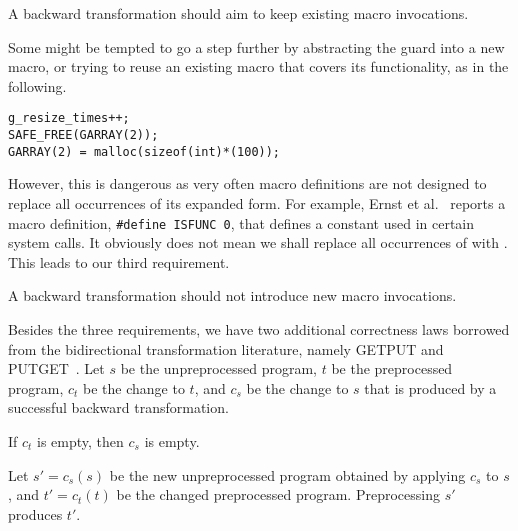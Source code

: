 \begin{decision}
A backward transformation should aim to keep existing macro invocations.
\end{decision}

Some might be tempted to go a step further by abstracting the guard into a new macro, or
trying to reuse an existing macro that covers its functionality, as in the following. 
\begin{lstlisting}
g_resize_times++;
SAFE_FREE(GARRAY(2));
GARRAY(2) = malloc(sizeof(int)*(100));
\end{lstlisting}
However, this is dangerous as very often macro definitions are
 not designed to replace all occurrences of its expanded
form. For example, Ernst et al.~\cite{ernst2002empirical} reports a
macro definition, \lstinline!#define ISFUNC 0!, that defines a constant used in certain system
calls. It obviously does not mean we shall replace all occurrences of 
with .
This
leads to our third requirement.

\begin{decision}
  A backward transformation should not introduce new macro invocations.
\end{decision}

Besides the three requirements, we have two additional correctness laws borrowed from the bidirectional transformation literature, namely GETPUT and
PUTGET~\cite{Foster:2007}. Let $s$ be the unpreprocessed
program, $t$ be the preprocessed program, $c_t$ be the change to $t$,
and $c_s$ be the change to $s$ that is produced by a successful
backward transformation.

\begin{decision}[GETPUT]
  If $c_t$ is empty, then $c_s$ is empty.
\end{decision}

\begin{decision}[PUTGET]
  Let $s'=c_s(s)$ be the new unpreprocessed program obtained by
  applying $c_s$ to $s$, and $t'=c_t(t)$ be the changed preprocessed
  program. Preprocessing $s'$ produces $t'$.
\end{decision}


